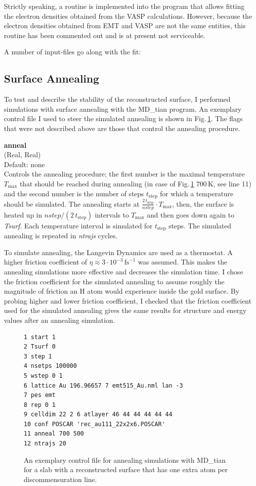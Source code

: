 \documentclass[twoside, 11pt, titlepage, captions=nooneline, a4paper, headsepline]{scrbook}%
\begin{document}
Strictly speaking, a routine is implemented into the program that allows fitting the electron densities obtained from the VASP calculations. However, because the electron densities obtained from EMT and VASP are not the same entities, this routine has been commented out and is at present not serviceable.

A number of input-files go along with the fit:

\subsection{Surface Annealing}
To test and describe the stability of the reconstructed surface, I performed simulations with surface annealing with the MD\_tian program. An exemplary control file I used to steer the simulated annealing is shown in Fig.\,\ref{Fig:mxt:anneal}. The flags that were not described above are those that control the annealing procedure.

\textbf{anneal}\\
(Real, Real)\\
Default: none\\
Controls the annealing procedure; the first number is the maximal temperature $T_\mathrm{max}$ that should be reached during annealing (in case of Fig.\,\ref{Fig:mxt:anneal} 700\,K, see line 11) and the second number is the number of steps $t_\mathrm{step}$ for which a temperature should be simulated.
The annealing starts at $\tfrac{2\,t_\mathrm{step}}{nstep} \cdot T_\mathrm{max}$, then, the surface is heated up in $nstep/(2\,t_\mathrm{step})$ intervals to $T_\mathrm{max}$ and then goes down again to \textit{Tsurf}. Each temperature interval is simulated for $t_\mathrm{step}$ steps. The simulated annealing is repeated in \textit{ntrajs} cycles.

To simulate annealing, the Langevin Dynamics are used as a thermostat. A higher friction coefficient of $\eta \approx 3\cdot10^{-3}$\,$\mathrm{fs}^{-1}$ was assumed. This makes the annealing simulations more effective and decreases the simulation time. I chose the friction coefficient for the simulated annealing to assume roughly the magnitude of friction an H atom would experience inside the gold surface. By probing higher and lower friction coefficient, I checked that the friction coefficient used for the simulated annealing gives the same results for structure and energy values after an annealing simulation.

\begin{figure}[b!]
\begin{verbatim}
1 start 1
2 Tsurf 0
3 step 1
4 nsetps 100000
5 wstep 0 1
6 lattice Au 196.96657 7 emt515_Au.nml lan -3
7 pes emt
8 rep 0 1
9 celldim 22 2 6 atlayer 46 44 44 44 44 44
10 conf POSCAR 'rec_au111_22x2x6.POSCAR'
11 anneal 700 500
12 ntrajs 20
\end{verbatim}
\caption{\label{Fig:mxt:anneal}An exemplary control file for annealing simulations with MD\_tian for a slab with a reconstructed surface that has one extra atom per discommensuration line.}
\end{figure}
\end{document}
